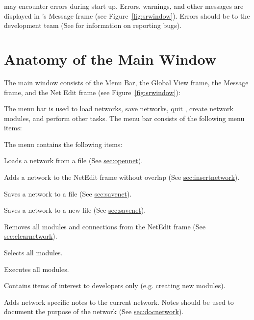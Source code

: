 \sr{} may encounter errors during start up.  Errors, warnings, and
other messages are displayed in \sr{}'s Message frame (see
Figure~\ref{fig:srwindow}).  Errors should be
 to the \sr{} development team
(See  for information on reporting
bugs).

\section{Anatomy of the Main Window}
\label{sec:windowanatomy}

The \sr{} main window consists of the Menu Bar, the Global View frame,
the Message frame, and the Net Edit frame (see
Figure~\ref{fig:srwindow}):

\begin{description}
   The menu bar is used to load networks, save
  networks, quit \sr{}, create network modules, and perform other
  tasks.  The menu bar consists of the following menu items:

  \begin{description}
     The  menu contains the following items:

    \begin{description}
       Loads a network from a file (See
      \hyperref{this section}{Section~}{}{sec:opennet}).
      
       Adds a network to the NetEdit frame
      without overlap (See \hyperref{this
        section}{Section~}{}{sec:insertnetwork}).
      
       Saves a network to a file (See \hyperref{this
        section}{Section~}{}{sec:savenet}).

       Saves a network to a new file (See
      \hyperref{this section}{Section~}{}{sec:savenet}).
      
       Removes all modules and connections from
      the NetEdit frame (See \hyperref{this
        section}{Section~}{}{sec:clearnetwork}).

       Selects all modules.

       Executes all modules.
      
       Contains items of interest to
      developers only (e.g. creating new modules).
      
       Adds network specific
      notes to the current network.  Notes should be used to document
      the purpose of the network (See \hyperref{this
        section}{Section~}{}{sec:docnetwork}).
    

\end{description}
\end{description}
\end{description}
